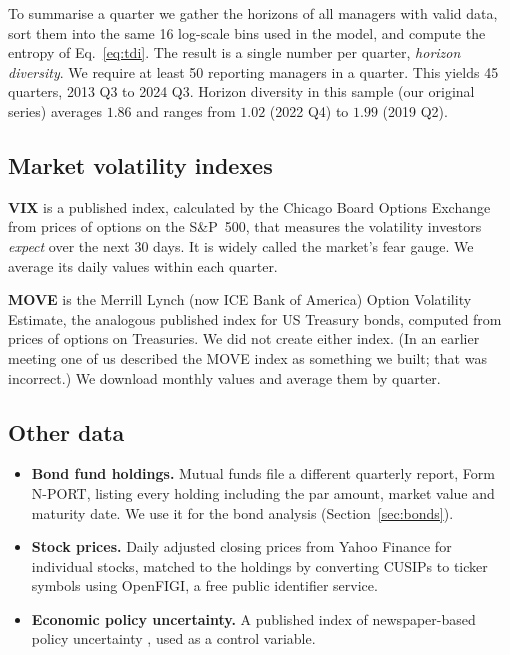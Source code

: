 To summarise a quarter we gather the horizons of all managers with valid data, sort them into the same 16 log-scale bins used in the model, and compute the entropy of Eq.~\eqref{eq:tdi}. The result is a single number per quarter, \emph{horizon diversity}. We require at least 50 reporting managers in a quarter. This yields 45 quarters, 2013 Q3 to 2024 Q3. Horizon diversity in this sample (our original series) averages $1.86$ and ranges from $1.02$ (2022 Q4) to $1.99$ (2019 Q2).

\subsection{Market volatility indexes}

\textbf{VIX} is a published index, calculated by the Chicago Board Options Exchange from prices of options on the S\&P~500, that measures the volatility investors \emph{expect} over the next 30 days. It is widely called the market's fear gauge. We average its daily values within each quarter.

\textbf{MOVE} is the Merrill Lynch (now ICE Bank of America) Option Volatility Estimate, the analogous published index for US Treasury bonds, computed from prices of options on Treasuries. We did not create either index. (In an earlier meeting one of us described the MOVE index as something we built; that was incorrect.) We download monthly values and average them by quarter.

\subsection{Other data}

\begin{itemize}[leftmargin=*]
\item \textbf{Bond fund holdings.} Mutual funds file a different quarterly report, Form N-PORT, listing every holding including the par amount, market value and maturity date. We use it for the bond analysis (Section~\ref{sec:bonds}).
\item \textbf{Stock prices.} Daily adjusted closing prices from Yahoo Finance for individual stocks, matched to the holdings by converting CUSIPs to ticker symbols using OpenFIGI, a free public identifier service.
\item \textbf{Economic policy uncertainty.} A published index of newspaper-based policy uncertainty \citep{baker2016}, used as a control variable.
\end{itemize}

